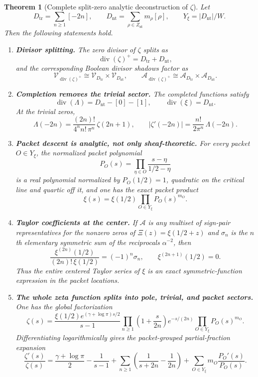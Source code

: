 \documentclass[11pt,a4paper]{article}
\newtheorem{theorem}{Theorem}[section]
\theoremstyle{definition}
\theoremstyle{remark}
\newcommand{\cV}{\mathcal V}
\newcommand{\cA}{\mathcal A}
\newcommand{\divv}{\operatorname{div}}
\begin{document}
\begin{theorem}[Complete split-zero analytic deconstruction of $\zeta$]\label{thm:final-summary}
Let
\[
D_{\mathrm{tr}}=\sum_{n\ge 1}[-2n],
\qquad
D_{\mathrm{nt}}=\sum_{\rho\in Z_{\mathrm{nt}}}m_\rho[\rho],
\qquad
Y_\xi=|D_{\mathrm{nt}}|/W.
\]
Then the following statements hold.

\begin{enumerate}[label=(\arabic*)]
\item \textbf{Divisor splitting.}
The zero divisor of $\zeta$ splits as
\[
\divv(\zeta)^+=D_{\mathrm{tr}}+D_{\mathrm{nt}},
\]
and the corresponding Boolean divisor shadows factor as
\[
\cV_{\divv(\zeta)^+}\cong \cV_{D_{\mathrm{tr}}}\times \cV_{D_{\mathrm{nt}}},
\qquad
\cA_{\divv(\zeta)^+}\cong \cA_{D_{\mathrm{tr}}}\times \cA_{D_{\mathrm{nt}}}.
\]

\item \textbf{Completion removes the trivial sector.}
The completed functions satisfy
\[
\divv(\Lambda)=D_{\mathrm{nt}}-[0]-[1],
\qquad
\divv(\xi)=D_{\mathrm{nt}}.
\]
At the trivial zeros,
\[
\Lambda(-2n)=\frac{(2n)!}{4^n n!\,\pi^n}\,\zeta(2n+1),
\qquad
\bigl|\zeta'(-2n)\bigr|=\frac{n!}{2\pi^n}\,\Lambda(-2n).
\]

\item \textbf{Packet descent is analytic, not only sheaf-theoretic.}
For every packet $O\in Y_\xi$, the normalized packet polynomial
\[
P_O(s)=\prod_{\eta\in O}\frac{s-\eta}{1/2-\eta}
\]
is a real polynomial normalized by $P_O(1/2)=1$, quadratic on the critical line and quartic off it, and one has the exact packet product
\[
\xi(s)=\xi(1/2)\prod_{O\in Y_\xi} P_O(s)^{m_O}.
\]

\item \textbf{Taylor coefficients at the center.}
If $\mathcal A$ is any multiset of sign-pair representatives for the nonzero zeros of $\Xi(z)=\xi(1/2+z)$ and $\sigma_n$ is the $n$th elementary symmetric sum of the reciprocals $\alpha^{-2}$, then
\[
\frac{\xi^{(2n)}(1/2)}{(2n)!\,\xi(1/2)}=(-1)^n\sigma_n,
\qquad
\xi^{(2n+1)}(1/2)=0.
\]
Thus the entire centered Taylor series of $\xi$ is an exact symmetric-function expression in the packet locations.

\item \textbf{The whole zeta function splits into pole, trivial, and packet sectors.}
One has the global factorization
\[
\zeta(s)
=
\frac{\xi(1/2)e^{(\gamma+\log\pi)s/2}}{s-1}
\prod_{n\ge 1}\left(1+\frac{s}{2n}\right)e^{-s/(2n)}
\prod_{O\in Y_\xi} P_O(s)^{m_O}.
\]
Differentiating logarithmically gives the packet-grouped partial-fraction expansion
\[
\frac{\zeta'(s)}{\zeta(s)}
=
\frac{\gamma+\log\pi}{2}
-\frac{1}{s-1}
+\sum_{n\ge 1}\left(\frac{1}{s+2n}-\frac{1}{2n}\right)
+\sum_{O\in Y_\xi} m_O\frac{P_O'(s)}{P_O(s)}.
\]


\end{enumerate}
\end{theorem}
\end{document}
